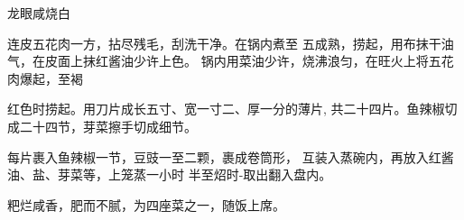 \begin{recipe}{龙眼咸烧白}

\ingredients


\cooking

\step 连皮五花肉一方，拈尽残毛，刮洗干净。在锅内煮至 五成熟，捞起，用布抹干油气，在皮面上抹红酱油少许上色。 锅内用菜油少许，烧沸浪匀，在旺火上将五花肉爆起，至褐

红色时捞起。用刀片成长五寸、宽一寸二、厚一分的薄片, 共二十四片。鱼辣椒切成二十四节，芽菜擦手切成细节。

\step 每片裹入鱼辣椒一节，豆豉一至二颗，裹成卷筒形， 互装入蒸碗内，再放入红酱油、盐、芽菜等，上笼蒸一小时 半至炤时-取出翻入盘内。

\notes

粑烂咸香，肥而不腻，为四座菜之一，随饭上席。

\end{recipe}

